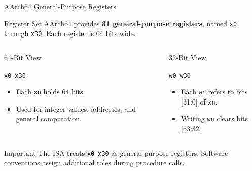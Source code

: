 \documentclass[aspectratio=169,11pt,t]{beamer}
\newcommand{\key}[1]{\textbf{#1}}
\newcommand{\code}[1]{\texttt{#1}}
\begin{document}
\begin{frame}{AArch64 General-Purpose Registers}

\begin{block}{Register Set}
AArch64 provides
\key{31 general-purpose registers},
named
\code{x0}
through
\code{x30}.
Each register is 64 bits wide.
\end{block}

\vspace{-0.1cm}

\begin{columns}[T,onlytextwidth]


\begin{block}{64-Bit View}

\begin{center}
\large
\code{x0}--\code{x30}
\end{center}

\begin{itemize}
  \item Each \code{xn}
        holds 64 bits.
  \item Used for integer values,
        addresses,
        and general computation.
\end{itemize}

\end{block}


\begin{block}{32-Bit View}

\begin{center}
\large
\code{w0}--\code{w30}
\end{center}

\begin{itemize}
  \item Each \code{wn}
        refers to bits [31:0]
        of \code{xn}.
  \item Writing \code{wn}
        clears bits [63:32].
\end{itemize}

\end{block}

\end{columns}

\vspace{-0.1cm}

\begin{block}{Important}
The ISA treats
\code{x0}--\code{x30}
as general-purpose registers.
Software conventions assign
additional roles during procedure calls.
\end{block}

\end{frame}
\end{document}
